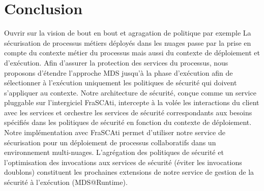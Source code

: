 \documentclass[runningheads,a4paper]{llncs}
\begin{document}
\section{Conclusion}
Ouvrir sur la vision de bout en bout et agragation de politique par exemple
\label{sec:end}
La s\'ecurisation de processus m\'etiers d\'eploy\'es dans les nuages passe par la prise en compte du contexte m\'etier du processus mais aussi du contexte de d\'eploiement et d’ex\'ecution. Afin d’assurer la protection des services du processus, nous proposons d’\'etendre l'approche MDS jusqu’\`a	 la phase d’ex\'ecution afin de s\'electionner \`a	 l’ex\'ecution uniquement les politiques de s\'ecurit\'e qui doivent s’appliquer au contexte. Notre architecture de s\'ecurit\'e, conçue comme un service pluggable sur l'intergiciel FraSCAti, intercepte \`a	 la vol\'ee les interactions du client avec les services et orchestre les services de s\'ecurit\'e correspondants aux besoins sp\'ecifi\'es dans les politiques de s\'ecurit\'e en fonction du contexte de d\'eploiement. Notre impl\'ementation avec FraSCAti permet d’utiliser notre service de s\'ecurisation pour un d\'eploiement de processus collaboratifs dans un environnement multi-nuages. L'agr\'egation des politiques de s\'ecurit\'e et l'optimisation des invocations aux services de s\'ecurit\'e (\'eviter les invocations doublons) constituent les prochaines extensions de notre service de gestion de la s\'ecurit\'e \`a	 l’ex\'ecution (MDS@Runtime).
\end{document}

